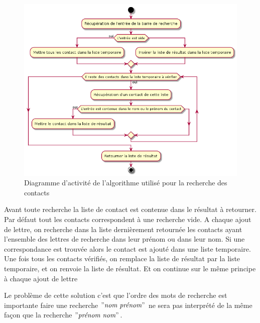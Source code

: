 \begin{figure}[!h]
	\centering
	\includegraphics[scale=0.6]{img/activity_retrieve_new.png}
	\caption{\label{activity_retrieve_new} {Diagramme d'activité de l'algorithme utilisé pour la recherche des contacts}}
\end{figure}

Avant toute recherche la liste de contact est contenue dans le résultat à retourner. Par défaut tout les contacts correspondent à une recherche vide. A chaque ajout de lettre, on recherche dans la liste dernièrement retournée les contacts ayant l'ensemble des lettres de recherche dans leur prénom ou dans leur nom. Si une correspondance est trouvée alors le contact est ajouté dans une liste temporaire. Une fois tous les contacts vérifiés, on remplace la liste de résultat par la liste temporaire, et on renvoie la liste de résultat. Et on continue sur le même principe à chaque ajout de lettre

\newpage

Le problème de cette solution c'est que l'ordre des mots de recherche est importante faire une recherche $"\textit{nom prénom}"$ ne sera pas interprété de la même façon que la recherche $"\textit{prénom nom}"$.

